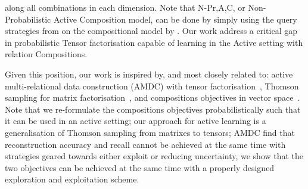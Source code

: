 along all combinations in each dimension. 
Note that N-Pr,A,C, or Non-Probabilistic Active Composition model, can be done by 
simply using the query strategies from \cite{kajino2015active} on the 
compositional model by \cite{guu2015traversing}. Our work address a critical gap 
in probabilistic Tensor factorisation capable of learning in the 
Active setting with relation Compositions.

Given this position, our work is inspired by, and most closely related to:
active multi-relational data construction (AMDC) 
with tensor factorisation~\cite{kajino2015active}, 
Thomson sampling for matrix factorisation~\cite{kawale2015efficient}, 
and compositions objectives in vector space~\cite{guu2015traversing}.
Note that we re-formulate the compositions objectives probabilistically such that it can be used in an active setting; 
our approach for active learning is a generalisation of
Thomson sampling from matrixes to tensors; 
AMDC find that reconstruction accuracy and recall 
cannot be achieved at the same time with strategies geared towards 
either exploit or reducing uncertainty, 
we show that the two objectives can be achieved at the same time with 
a properly designed exploration and exploitation scheme. 



